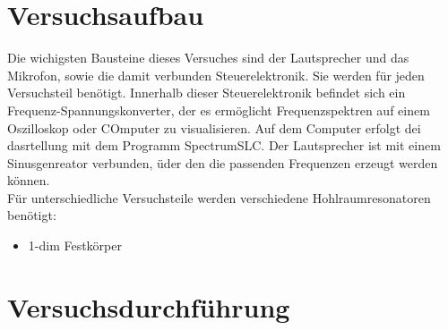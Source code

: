 \section{Versuchsaufbau}
\label{sec:Versuchsaufbau}
Die wichigsten Bausteine dieses Versuches sind der Lautsprecher und das Mikrofon, sowie 
die damit verbunden Steuerelektronik. Sie werden für jeden Versuchsteil benötigt.
Innerhalb dieser Steuerelektronik befindet sich ein Frequenz-Spannungskonverter, 
der es ermöglicht Frequenzspektren auf einem Oszilloskop oder COmputer zu visualisieren.
Auf dem Computer erfolgt dei dasrtellung mit dem Programm SpectrumSLC.
Der Lautsprecher ist mit einem Sinusgenreator verbunden, üder den die passenden 
Frequenzen erzeugt werden können.\\

Für unterschiedliche Versuchsteile werden verschiedene Hohlraumresonatoren benötigt:
\begin{itemize}
    \item 1-dim Festkörper
        \begin{itemize}
            
        \end{itemize}
\end{itemize}




\section{Versuchsdurchführung}
\label{sec:Versuchsdurchführung}
